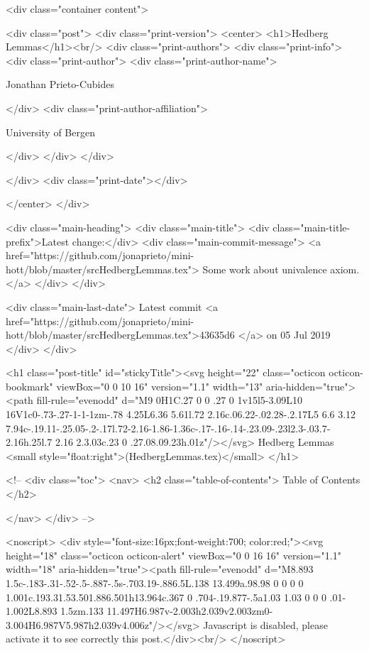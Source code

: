       <div class="container content">
        







<div class="post">
  <div class="print-version">
    <center>
      <h1>Hedberg Lemmas</h1><br/>
        <div class="print-authors">
          <div class="print-info">
            <div class="print-author">
              <div class="print-author-name">
                
                  Jonathan Prieto-Cubides
                
              </div>
              <div class="print-author-affiliation">
                
                  University of Bergen
                
                </div>
            </div>
          </div>
          
          
        </div>
        <div class="print-date"></div>
        
        
    </center>
  </div>

  
  <div class="main-heading">
    <div class="main-title">
      <div class="main-title-prefix">Latest change:</div>
      <div class="main-commit-message">
            <a href="https://github.com/jonaprieto/mini-hott/blob/master/srcHedbergLemmas.tex">
              Some work about univalence axiom.</a>
      </div>
    </div>

    <div class="main-last-date">
      Latest commit <a href="https://github.com/jonaprieto/mini-hott/blob/master/srcHedbergLemmas.tex">43635d6 </a> on  05 Jul 2019
    </div>
  </div>
  

  <h1 class="post-title" id="stickyTitle"><svg height="22" class="octicon octicon-bookmark" viewBox="0 0 10 16" version="1.1" width="13" aria-hidden="true"><path fill-rule="evenodd" d="M9 0H1C.27 0 0 .27 0 1v15l5-3.09L10 16V1c0-.73-.27-1-1-1zm-.78 4.25L6.36 5.61l.72 2.16c.06.22-.02.28-.2.17L5 6.6 3.12 7.94c-.19.11-.25.05-.2-.17l.72-2.16-1.86-1.36c-.17-.16-.14-.23.09-.23l2.3-.03.7-2.16h.25l.7 2.16 2.3.03c.23 0 .27.08.09.23h.01z"/></svg> Hedberg Lemmas <small style="float:right">(HedbergLemmas.tex)</small>
  </h1>

  <!-- 
  <div class="toc">
    <nav>
    <h2 class="table-of-contents"> Table of Contents </h2>
      

    </nav>
  </div>
   -->

  <noscript>
  <div style="font-size:16px;font-weight:700; color:red;"><svg height="18" class="octicon octicon-alert" viewBox="0 0 16 16" version="1.1" width="18" aria-hidden="true"><path fill-rule="evenodd" d="M8.893 1.5c-.183-.31-.52-.5-.887-.5s-.703.19-.886.5L.138 13.499a.98.98 0 0 0 0 1.001c.193.31.53.501.886.501h13.964c.367 0 .704-.19.877-.5a1.03 1.03 0 0 0 .01-1.002L8.893 1.5zm.133 11.497H6.987v-2.003h2.039v2.003zm0-3.004H6.987V5.987h2.039v4.006z"/></svg> Javascript is disabled, please activate it to see correctly this post.</div><br/>
  </noscript>


